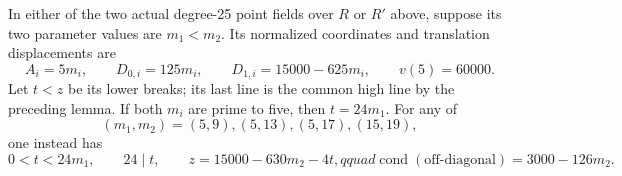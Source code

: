 \begin{lemma}
\label{lem:B-RD94-common-high}
In either of the two actual degree-25 point fields over $R$ or
$R'$ above, suppose its two parameter values are $m_1<m_2$.
Its normalized coordinates and translation displacements are
\[
 A_i=5m_i,\qquad D_{0,i}=125m_i,\qquad
 D_{1,i}=15000-625m_i,\qquad v(5)=60000.             \tag{B-RD94.9}
\]
Let $t<z$ be its lower breaks; its last line is the common high
line by the preceding lemma.
If both $m_i$ are prime to five, then $t=24m_1$.
For any of
\[
                 (m_1,m_2)=(5,9),(5,13),(5,17),(15,19),
                                                        \tag{B-RD94.10}
\]
one instead has
\[
 0<t<24m_1,\qquad24\mid t,\qquad
 z=15000-630m_2-4t,qquad
 \operatorname{cond}(\text{off-diagonal})=3000-126m_2.
                                                        \tag{B-RD94.11}
\]
\end{lemma}
